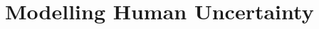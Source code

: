 %
%
%
%

%
%
%
%
%
%
%
%
%
%
%
%
%
%
%


\chapter{Modelling Human Uncertainty} \label{chapter:humanuncertainty}

